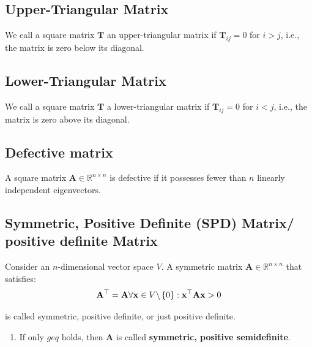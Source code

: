 
\subsection{Upper-Triangular Matrix \cite{mfml-1}}\label{Upper-Triangular Matrix}
We call a square matrix $\mathbf{T}$ an upper-triangular matrix if $\mathbf{T}_{ij} = 0$ for $i > j$, i.e., the matrix is zero below its diagonal.


\subsection{Lower-Triangular Matrix \cite{mfml-1}}\label{Lower-Triangular Matrix}
We call a square matrix $\mathbf{T}$ a lower-triangular matrix if $\mathbf{T}_{ij} = 0$ for $i < j$, i.e., the matrix is zero above its diagonal.


\subsection{Defective matrix \cite{mfml-1}}\label{Defective matrix}
A square matrix $\mathbf{A} \in \mathbb{R}^{n\times n}$ is defective if it possesses fewer than $n$ linearly independent eigenvectors.


\subsection{Symmetric, Positive Definite (SPD) Matrix/ positive definite Matrix \cite{mfml-1}}\label{Symmetric, Positive Definite (SPD) Matrix/ positive definite Matrix}

Consider an $n$-dimensional vector space $V$. A symmetric matrix $\mathbf{A} \in \mathbb{R}^{n\times n}$ that satisfies:
\[
    \displaystyle
    \hfill
    \mathbf{A^\top = A}
    \hfill
    \forall \mathbf{x} \in V \backslash \dCurlyBrac{ 0 } : \mathbf{x^\top A x} > 0
    \hfill
\]

is called symmetric, positive definite, or just positive definite. 

\begin{enumerate}
    \item If only $geq$ holds, then $\mathbf{A}$ is called \textbf{symmetric, positive semidefinite}.
    
\end{enumerate}

